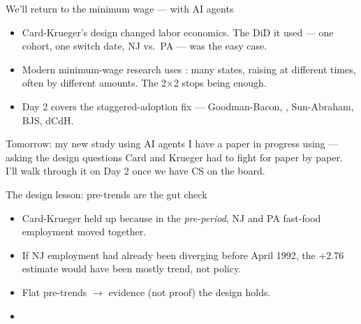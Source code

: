 \documentclass[aspectratio=169,11pt]{beamer}
\begin{document}
\begin{frame}{We'll return to the minimum wage --- with AI agents}
\vspace{0.6em}
\begin{itemize}
  \item Card-Krueger's design changed labor economics. \;The DiD it used --- one cohort, one switch date, NJ vs.\ PA --- was the easy case.
  \item Modern minimum-wage research uses : many states, raising at different times, often by different amounts. \;The 2$\times$2 stops being enough.
  \item Day 2 covers the staggered-adoption fix --- Goodman-Bacon, , Sun-Abraham, BJS, dCdH.
\end{itemize}
\vspace{0.5em}
\begin{block}{Tomorrow: my new study using AI agents}
\small
I have a paper in progress using  --- asking the design questions Card and Krueger had to fight for paper by paper. \;I'll walk through it on Day 2 once we have CS on the board.
\end{block}
\end{frame}

\begin{frame}{The design lesson: pre-trends are the gut check}
\vspace{0.4em}
\begin{itemize}
  \item Card-Krueger held up because in the \textit{pre-period}, NJ and PA fast-food employment moved together.
  \item If NJ employment had already been diverging before April 1992, the +2.76 estimate would have been mostly trend, not policy.
  \item Flat pre-trends $\rightarrow$ evidence (not proof) the design holds.
  \item {}
\end{itemize}
\vspace{0.4em}
\end{frame}
\end{document}
